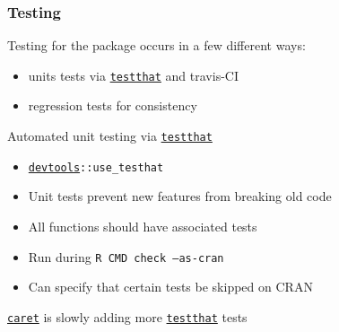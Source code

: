 \documentclass[12 pt]{beamer}\usepackage[]{graphicx}\usepackage[]{color}
\newcommand{\hlkwd}[1]{\textcolor[rgb]{0.78,0.227,0.412}{#1}}%
\newcommand{\mxkwd}[1]{\texttt{\hlkwd{#1}}}%
\newcommand{\pkg}[1]{{\fontseries{b}\selectfont #1}}
\renewcommand{\pkg}[1]{{\color{darkgreen}\texttt{#1}}}
\begin{document}
  \begin{frame}[fragile]
\frametitle{Testing}

Testing for the package occurs in a few different ways:
\begin{itemize}
\item units tests via \href{http://cran.r-project.org/web/packages/testthat/index.html}{\pkg{testthat}} and travis-CI
\item regression tests for consistency
\end{itemize}

\vspace{.2in}

Automated unit testing via \href{http://cran.r-project.org/web/packages/testthat/index.html}{\pkg{testthat}}

\begin{itemize}
\item \href{http://cran.r-project.org/web/packages/testthat/index.html}{\pkg{devtools}}{\tt ::\mxkwd{use\_testhat}}
\item Unit tests prevent new features from breaking old code
\item All functions should have associated tests
\item Run during {\tt R CMD check --as-cran}
\item Can specify that certain tests be skipped on CRAN
\end{itemize}

\href{http://cran.r-project.org/web/packages/caret/index.html}{\pkg{caret}} is slowly adding more \href{http://cran.r-project.org/web/packages/testthat/index.html}{\pkg{testthat}} tests

\end{frame}

\end{document}
